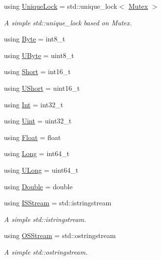 \begin{DoxyCompactItemize}
using \mbox{\hyperlink{namespaceo_a_a2a6e84e4843983460eace0e5ae899a1e}{Unique\+Lock}} = std\+::unique\+\_\+lock$<$ \mbox{\hyperlink{namespaceo_a_adc2c4dfe90e78df47ae2e677a4d0f9fa}{Mutex}} $>$
\begin{DoxyCompactList}\small\item\em A simple std\+::unique\+\_\+lock based on Mutex. \end{DoxyCompactList}\item 
using \mbox{\hyperlink{namespaceo_a_a2b99671898a8eb4bc6ab35036701d732}{Byte}} = int8\+\_\+t
\item 
using \mbox{\hyperlink{namespaceo_a_a8c38e43a304d568b8495770dd8d50513}{U\+Byte}} = uint8\+\_\+t
\item 
using \mbox{\hyperlink{namespaceo_a_a17d2753cd7febb25f447b0cff6cec6eb}{Short}} = int16\+\_\+t
\item 
using \mbox{\hyperlink{namespaceo_a_a0e8a8217ae95045f36575875dcb54537}{U\+Short}} = uint16\+\_\+t
\item 
using \mbox{\hyperlink{namespaceo_a_aa575525a7b0116822c73d43fa671a58c}{Int}} = int32\+\_\+t
\item 
using \mbox{\hyperlink{namespaceo_a_abe1d8250226c5cf34f84d7b75fc7922e}{Uint}} = uint32\+\_\+t
\item 
using \mbox{\hyperlink{namespaceo_a_a513e9cb16924b482268ab3fcdf1f2499}{Float}} = float
\item 
using \mbox{\hyperlink{namespaceo_a_ab34d92c907da3ac86211277a1341c6c2}{Long}} = int64\+\_\+t
\item 
using \mbox{\hyperlink{namespaceo_a_aeb20ba1e00df0faadde3654ff7d8c4e7}{U\+Long}} = uint64\+\_\+t
\item 
using \mbox{\hyperlink{namespaceo_a_a2bcc976232176d2dcf8b9df1fa33c038}{Double}} = double
\item 
using \mbox{\hyperlink{namespaceo_a_a60595f5d8b3d5dbbb9d1ed512917b09b}{I\+S\+Stream}} = std\+::istringstream
\begin{DoxyCompactList}\small\item\em A simple std\+::istringstream. \end{DoxyCompactList}\item 
using \mbox{\hyperlink{namespaceo_a_a9075675ddf98c92f09ba17d3b993a72a}{O\+S\+Stream}} = std\+::ostringstream
\begin{DoxyCompactList}\small\item\em A simple std\+::ostringstream. \end{DoxyCompactList}\item 

\end{DoxyCompactItemize}
